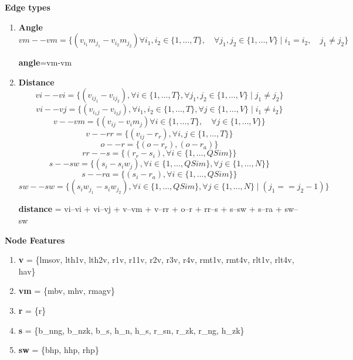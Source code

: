 \documentclass[a4paper,12pt]{article}
\begin{document}
\textbf{Edge types}

\begin{enumerate}
    \item \textbf{Angle} \\
    \[
    vm--vm = \{ (v_{i_{1}}m_{j_{1}} - v_{i_{2}}m_{j_{2}})
    \forall i_1, i_2 \in \{1, \dots, T\}, \quad \forall j_1, j_2 \in \{1, \dots, V\} \mid
    i_1 = i_2, \quad j_1 \neq j_2\}
    \]

    \textbf{angle}=vm-vm

    \item \textbf{Distance} \\
    \[
        vi--vi = \{ (v_{i j_1} - v_{i j_2}), \forall i \in \{1, \dots, T\}, \forall j_1, j_2 \in \{1, \dots, V\} \mid  j_1 \neq j_2 \}
    \]
    \[
        vi--vj = \{ (v_{i_1 j} - v_{i_2 j}), \forall i_1, i_2 \in \{1, \dots, T\}, \forall j \in \{1, \dots, V\} \mid  i_1 \neq i_2 \}
    \]
    \[
        v--vm = \{ (v_{i j} - v_{i}m_{j}) \forall i  \in \{1, \dots, T\}, \quad \forall j \in \{1, \dots, V\} \}
    \]
    \[
        v--rr = \{ (v_{i j} - r_{r}), \forall i, j  \in \{1, \dots, T\}\}
    \]
    \[
        o--r = \{ (o - r_{r}), (o - r_{a})\}
    \]
    \[
        rr--s = \{ (r_{r} - s_{i}), \forall i  \in \{1, \dots, QSim\}\}
    \]
    \[
        s--sw = \{ (s_{i} - s_{i}w_{j}), \forall i  \in \{1, \dots, QSim\}, \forall j  \in \{1, \dots, N\}\}
    \]
    \[
        s--ra = \{ (s_{i} - r_{a}), \forall i  \in \{1, \dots, QSim\}\}
    \]
    \[
        sw--sw = \{ (s_{i}w_{j_1} - s_{i}w_{j_2}), \forall i  \in \{1, \dots, QSim\}, \forall j  \in \{1, \dots, N\} \mid (j_1 == j_2-1)\}
    \]

    \textbf{distance} = vi--vi + vi--vj + v--vm + v--rr + o--r + rr--s + s--sw + s--ra + sw--sw

\end{enumerate}

\textbf{Node Features}

\begin{enumerate}

    \item \textbf{v} = \{lmsov, lth1v, lth2v, r1v, r11v, r2v, r3v, r4v, rmt1v, rmt4v, rlt1v, rlt4v, hav\}

    \item \textbf{vm} = \{mbv, mhv, rmagv\}

    \item \textbf{r} = \{r\}

    \item \textbf{s} = \{b\_nng, b\_nzk, b\_s, h\_n, h\_s, r\_sn, r\_zk, r\_ng, h\_zk\}

    \item \textbf{sw} = \{bhp, hhp, rhp\}
\end{enumerate}
\end{document}
